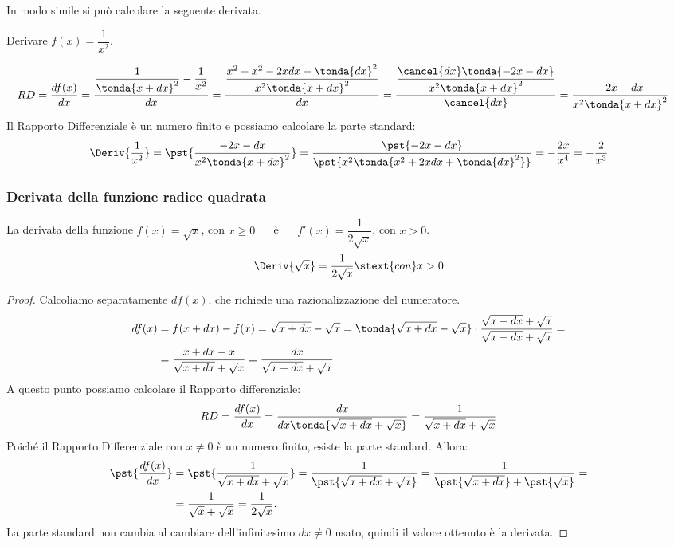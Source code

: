 In modo simile si può calcolare la seguente derivata.
\begin{esempio}
\label{esem:differenziale_reciprocaq}
Derivare \(f(x)=\dfrac{1}{x^2}\).

\begin{align*}
RD &= \dfrac{df(x)}{dx}=
\dfrac{\dfrac{1}{\tonda{x+dx}^2}-\dfrac{1}{x^2}}{dx}= 
\dfrac{\dfrac{x^2-x^2-2xdx-\tonda{dx}^2}{x^2 \tonda{x+dx}^2}}{dx}=
\dfrac{\dfrac{\cancel{dx} \tonda{-2x-dx}}{x^2 \tonda{x+dx}^2}}
      {\cancel{dx}}=
\dfrac{-2x-dx}{x^2 \tonda{x+dx}^2}
\end{align*}
Il Rapporto Differenziale è un numero finito e 
possiamo calcolare la parte standard:
\[\Deriv{\dfrac{1}{x^2}} = 
\pst{\dfrac{-2x-dx}{x^2 \tonda{x+dx}^2}}=
\dfrac{\pst{-2x-dx}}{\pst{x^2 \tonda{x^2+2xdx+\tonda{dx}^2}}}=
-\dfrac{2x}{x^4} = -\dfrac{2}{x^3}\]
\end{esempio}

\subsubsection{Derivata della funzione radice quadrata}
\label{subsubsec:f_radice}
\begin{teorema}
  La derivata della funzione \(f(x)=\sqrt{x}\), con \(x \geq 0\) ~~ è ~~ 
\(f'(x) = \dfrac{1}{2\sqrt{x}}\), con \(x > 0\).
\[\Deriv{\sqrt{x}} = \dfrac{1}{2\sqrt{x}} \stext{ con } x > 0\]
\end{teorema}
\begin{proof}
Calcoliamo separatamente \(df(x)\), che richiede una razionalizzazione 
del numeratore. 
\begin{align*}
df(x) &= f(x+dx)-f(x)=\sqrt{x+dx}-\sqrt{x}=
   \tonda{\sqrt{x+dx}-\sqrt{x}} \cdot \frac{\sqrt{x+dx}+ 
     \sqrt{x}}{\sqrt{x+dx}+\sqrt{x}}=\\
&= \frac{x+dx-x}{\sqrt{x+dx}+\sqrt{x}}=
   \frac{dx}{\sqrt{x+dx}+\sqrt{x}}
\end{align*}
A questo punto possiamo calcolare il Rapporto differenziale:
\[RD=\dfrac{df(x)}{dx}=\dfrac{dx}{dx\tonda{\sqrt{x+dx}+\sqrt{x}}}=
    \dfrac{1}{\sqrt{x+dx}+\sqrt{x}}\]
Poiché il Rapporto Differenziale  con \(x\ne 0\) è un numero finito, 
esiste la parte standard. Allora:
\begin{align*}
 \pst{\dfrac{df(x)}{dx}}&= \pst{\dfrac{1}{\sqrt{x+dx}+\sqrt{x}}}=
      \dfrac{1}{\pst{\sqrt{x+dx}+\sqrt{x}}}=
      \dfrac{1}{\pst{\sqrt{x+dx}}+\pst{\sqrt{x}}}=\\
      &=\dfrac{1}{\sqrt{x}+\sqrt{x}}=\dfrac{1}{2\sqrt{x}}.
\end{align*}
La parte standard non cambia al cambiare dell'infinitesimo \(dx \ne 0\) 
usato, quindi il valore ottenuto è la derivata.
\end{proof}

